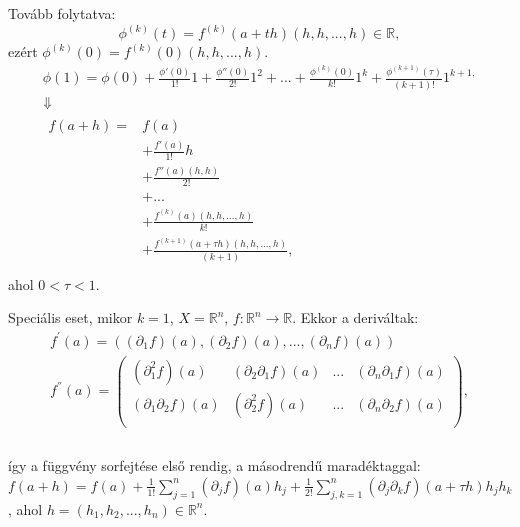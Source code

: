 \documentclass[12pt,a4paper]{scrartcl}
\begin{document}
Tovább folytatva:
\[{\phi ^{\left( k \right)}}\left( t \right) = {f^{\left( k \right)}}\left( {a + th} \right)\left( {h,h,...,h} \right) \in \mathbb{R},\]ezért
\(\phi^{(k)}\left( 0 \right) = f^{(k)}\left( 0 \right)\left( {h,h,...,h} \right)\).
\[\begin{array}{*{20}{c}}
  {\phi \left( 1 \right) = \phi \left( 0 \right) + \frac{{\phi '\left( 0 \right)}}{{1!}}1 + \frac{{\phi ''\left( 0 \right)}}{{2!}}{1^2} + ... + \frac{{{\phi ^{\left( k \right)}}\left( 0 \right)}}{{k!}}{1^k} + \frac{{{\phi ^{\left( {k + 1} \right)}}\left( \tau  \right)}}{{\left( {k + 1} \right)!}}{1^{k + 1,}}} \\ 
   \Downarrow  \\ 
  \begin{aligned}
  f\left( {a + h} \right) =  & f\left( a \right) \\ 
   &  + \frac{{f'\left( a \right)}}{{1!}}h \\ 
   &  + \frac{{f''\left( a \right)\left( {h,h} \right)}}{{2!}} \\ 
   &  + ... \\ 
   &  + \frac{{{f^{\left( k \right)}}\left( a \right)\left( {h,h,...,h} \right)}}{{k!}} \\ 
   &  + \frac{{{f^{\left( {k + 1} \right)}}\left( {a + \tau h} \right)\left( {h,h,...,h} \right)}}{{\left( {k + 1} \right)}}, \\ 
\end{aligned}  
\end{array}\]ahol \(0 < \tau < 1\).

Speciális eset, mikor \(k = 1\), \(X = {\mathbb{R}}^{n}\),
\(\left. f:{\mathbb{R}}^{n}\rightarrow{\mathbb{R}} \right.\). Ekkor a
deriváltak: \[\begin{array}{l}
{f^{\prime}\left( a \right) = \left( {\left( {\partial_{1}f} \right)\left( a \right),\left( {\partial_{2}f} \right)\left( a \right),...,\left( {\partial_{n}f} \right)\left( a \right)} \right)} \\
{f^{''}\left( a \right) = \left( \begin{array}{llll}
{\left( {\partial_{1}^{2}f} \right)\left( a \right)} & {\left( {\partial_{2}\partial_{1}f} \right)\left( a \right)} & ... & {\left( {\partial_{n}\partial_{1}f} \right)\left( a \right)} \\
{\left( {\partial_{1}\partial_{2}f} \right)\left( a \right)} & {\left( {\partial_{2}^{2}f} \right)\left( a \right)} & ... & {\left( {\partial_{n}\partial_{2}f} \right)\left( a \right)} \\
\end{array} \right),} \\
\end{array}\]\\
így a függvény sorfejtése első rendig, a másodrendű maradéktaggal:
\(f\left( {a + h} \right) = f\left( a \right) + \frac{1}{1!}{\sum\limits_{j = 1}^{n}{\left( {\partial_{j}f} \right)\left( a \right)h_{j}}} + \frac{1}{2!}{\sum\limits_{j,k = 1}^{n}{\left( {\partial_{j}\partial_{k}f} \right)\left( {a + \tau h} \right)h_{j}}}h_{k}\),
ahol
\(h = \left( {h_{1},h_{2},...,h_{n}} \right) \in {\mathbb{R}}^{n}\).
\end{document}
